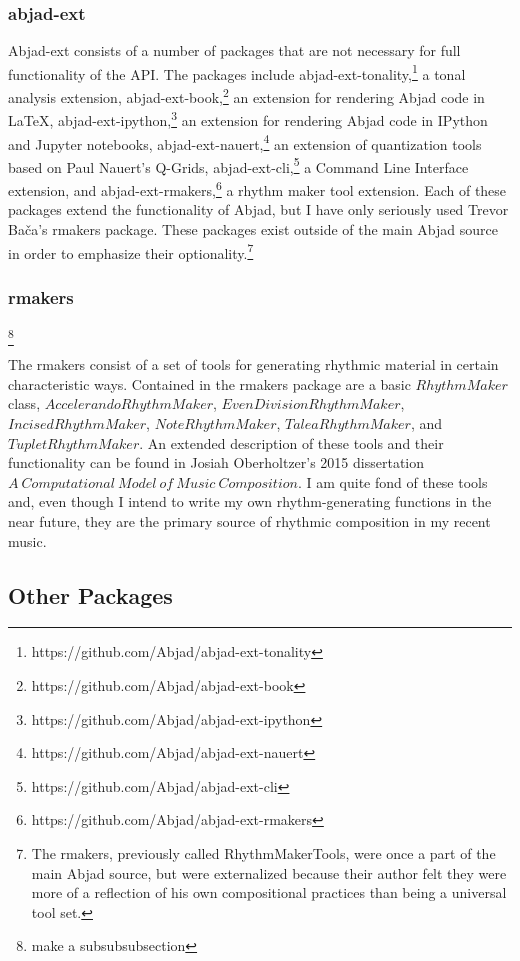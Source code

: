 \subsubsection{abjad-ext}

Abjad-ext consists of a number of packages that are not necessary for full functionality of the API. The packages include abjad-ext-tonality,\footnote{https://github.com/Abjad/abjad-ext-tonality} a tonal analysis extension, abjad-ext-book,\footnote{https://github.com/Abjad/abjad-ext-book} an extension for rendering Abjad code in \LaTeX, abjad-ext-ipython,\footnote{https://github.com/Abjad/abjad-ext-ipython} an extension for rendering Abjad code in IPython and Jupyter notebooks, abjad-ext-nauert,\footnote{https://github.com/Abjad/abjad-ext-nauert} an extension of quantization tools based on Paul Nauert’s Q-Grids, abjad-ext-cli,\footnote{https://github.com/Abjad/abjad-ext-cli} a Command Line Interface extension, and abjad-ext-rmakers,\footnote{https://github.com/Abjad/abjad-ext-rmakers} a rhythm maker tool extension. Each of these packages extend the functionality of Abjad, but I have only seriously used Trevor Ba\v{c}a’s rmakers package. These packages exist outside of the main Abjad source in order to emphasize their optionality.\footnote{The rmakers, previously called RhythmMakerTools, were once a part of the main Abjad source, but were externalized because their author felt they were more of a reflection of his own compositional practices than being a universal tool set.}

\subsubsection{rmakers}\footnote{make a subsubsubsection}

The rmakers consist of a set of tools for generating rhythmic material in certain characteristic ways. Contained in the rmakers package are a basic $RhythmMaker$ class, $AccelerandoRhythmMaker$, $EvenDivisionRhythmMaker$, $IncisedRhythmMaker$, $NoteRhythmMaker$, $TaleaRhythmMaker$, and $TupletRhythmMaker$. An extended description of these tools and their functionality can be found in Josiah Oberholtzer’s 2015 dissertation $A \: Computational \: Model \: of \: Music \: Composition$.\cite[pp. 118--128]{Oberholtzer} I am quite fond of these tools and, even though I intend to write my own rhythm-generating functions in the near future, they are the primary source of rhythmic composition in my recent music.

\subsection{Other Packages}

